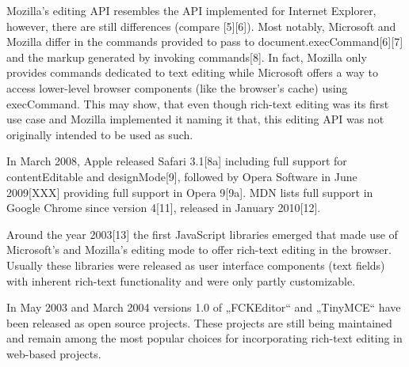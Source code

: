 Mozilla’s editing API resembles the API implemented for Internet Explorer, however, there are still differences (compare [5][6]). Most notably, Microsoft and Mozilla differ in the commands provided to pass to document.execCommand[6][7] and the markup generated by invoking commands[8]. In fact, Mozilla only provides commands dedicated to text editing while Microsoft offers a way to access lower-level browser components (like the browser’s cache) using execCommand. This may show, that even though rich-text editing was its first use case and Mozilla implemented it naming it that, this editing API was not originally intended to be used as such.

In March 2008, Apple released Safari 3.1[8a] including full support for contentEditable and designMode[9], followed by Opera Software in June 2009[XXX] providing full support in Opera 9[9a]. MDN lists full support in Google Chrome since version 4[11], released in January 2010[12].

Around the year 2003[13] the first JavaScript libraries emerged that made use of Microsoft’s and Mozilla’s editing mode to offer rich-text editing in the browser. Usually these libraries were released as user interface components (text fields) with inherent rich-text functionality and were only partly customizable.

In May 2003 and March 2004 versions 1.0 of „FCKEditor“ and „TinyMCE“ have been released as open source projects. These projects are still being maintained and remain among the most popular choices for incorporating rich-text editing in web-based projects.
